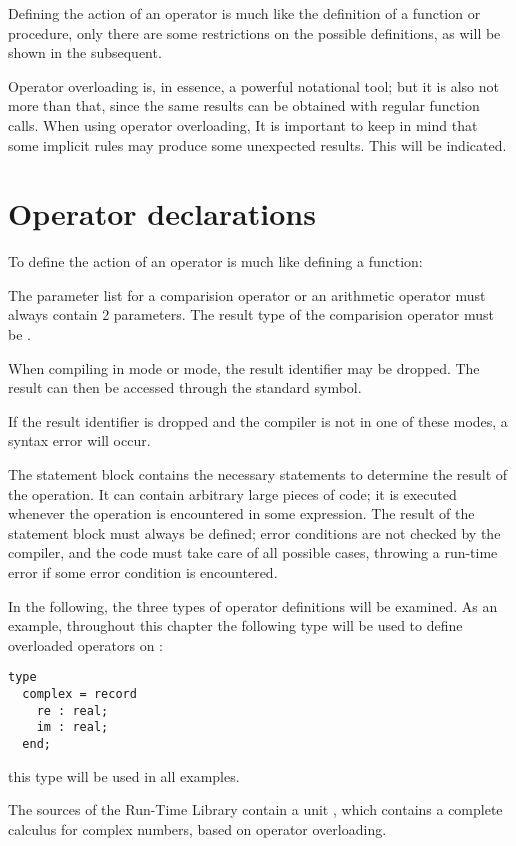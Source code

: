 Defining the action of an operator is much like the definition of a
function or procedure, only there are some restrictions on the possible
definitions, as will be shown in the subsequent.

Operator overloading is, in essence, a powerful notational tool;
but it is also not more than that, since the same results can be
obtained with regular function calls. When using operator overloading,
It is important to keep in mind that some implicit rules may produce
some unexpected results. This will be indicated.

\section{Operator declarations}
To define the action of an operator is much like defining a function:

The parameter list for a comparision operator or an arithmetic operator
must always contain 2 parameters. The result type of the comparision
operator must be .

\begin{remark}
When compiling in  mode or  mode, the result
identifier may be dropped. The result can then be accessed through
the standard  symbol.

If the result identifier is dropped and the compiler is not in one
of these modes, a syntax error will occur.
\end{remark}

The statement block contains the necessary statements to determine the
result of the operation. It can contain arbitrary large pieces of code;
it is executed whenever the operation is encountered in some expression.
The result of the statement block must always be defined; error conditions
are not checked by the compiler, and the code must take care of all possible
cases, throwing a run-time error if some error condition is encountered.

In the following, the three types of operator definitions will be examined.
As an example, throughout this chapter the following type will be used to
define overloaded operators on :
\begin{verbatim}
type
  complex = record
    re : real;
    im : real;
  end;
\end{verbatim}
this type will be used in all examples.

The sources of the Run-Time Library contain a unit ,
which contains a complete calculus for complex numbers, based on
operator overloading.

